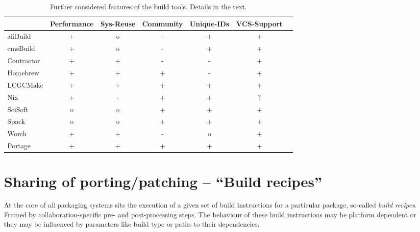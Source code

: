 \documentclass[12pt,a4paper]{article}
\begin{document}
\begin{table}
\centering
\begin{tabular}{lcccccc}

&Performance & Sys-Reuse & Community & Unique-IDs & VCS-Support\\ \hline
aliBuild & \cellcolor{green} + & \cellcolor{yellow} o & \cellcolor{red} - & \cellcolor{green} +& \cellcolor{green} +  \\
cmsBuild & \cellcolor{green} + & \cellcolor{yellow} o & \cellcolor{red} - & \cellcolor{green} +& \cellcolor{green} +  \\
Contractor & \cellcolor{green} + & \cellcolor{green} + & \cellcolor{red} - & \cellcolor{red} - & \cellcolor{green} + \\
Homebrew & \cellcolor{green} +  & \cellcolor{green} +  & \cellcolor{green} + & \cellcolor{red} - & \cellcolor{green} + \\
LCGCMake & \cellcolor{green} + & \cellcolor{green} + & \cellcolor{yellow} + & \cellcolor{green} + & \cellcolor{green} + \\
Nix & \cellcolor{green} + & \cellcolor{red} -  & \cellcolor{green} + & \cellcolor{green} + & ? \\
SciSoft & \cellcolor{yellow} o & \cellcolor{yellow} o & \cellcolor{green} + &  \cellcolor{green} + & \cellcolor{green}+  \\
Spack & \cellcolor{yellow} o & \cellcolor{yellow} o  & \cellcolor{green} + & \cellcolor{green} +& \cellcolor{green} +\\
Worch & \cellcolor{green} + &  \cellcolor{green} + & \cellcolor{red} -  & \cellcolor{yellow} o & \cellcolor{green} + \\
Portage & \cellcolor{green} + & \cellcolor{green} +  & \cellcolor{green} + & \cellcolor{green} +& \cellcolor{green} +
\end{tabular}
\caption{\label{tab:taxonomyOthers}Further considered features of the build tools. Details in the text.}
\end{table}

\section{Sharing of porting/patching -- ``Build recipes''}
At the core of all packaging systems sits the execution of a given set of build instructions for a particular package, so-called \emph{build recipes}. Framed by collaboration-specific pre- and post-processing steps. The behaviour of these build instructions may be platform dependent or they may be influenced by parameters like build type or paths to their dependencies.
\end{document}
